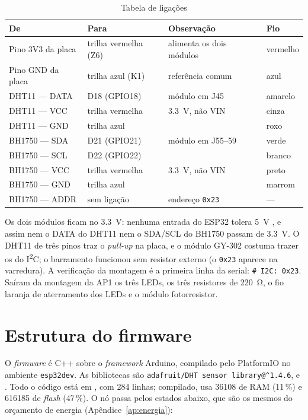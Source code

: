 \begin{table}[H]
\centering
\caption{Tabela de ligações}
\label{tab:ligacoes}
\footnotesize
\begin{tabular}{@{}L{3.6cm}L{3.4cm}L{4.4cm}L{1.8cm}@{}}
\toprule
\textbf{De} & \textbf{Para} & \textbf{Observação} & \textbf{Fio} \\
\midrule
Pino 3V3 da placa & trilha vermelha (Z6) & alimenta os dois módulos & vermelho \\
Pino GND da placa & trilha azul (K1) & referência comum & azul \\
DHT11 --- DATA & D18 (GPIO18) & módulo em J45 & amarelo \\
DHT11 --- VCC & trilha vermelha & \SI{3.3}{\volt}, não VIN & cinza \\
DHT11 --- GND & trilha azul & & roxo \\
BH1750 --- SDA & D21 (GPIO21) & módulo em J55--59 & verde \\
BH1750 --- SCL & D22 (GPIO22) & & branco \\
BH1750 --- VCC & trilha vermelha & \SI{3.3}{\volt}, não VIN & preto \\
BH1750 --- GND & trilha azul & & marrom \\
BH1750 --- ADDR & sem ligação & endereço \texttt{0x23} & --- \\
\bottomrule
\end{tabular}
\end{table}

Os dois módulos ficam no \SI{3.3}{\volt}: nenhuma entrada do ESP32
tolera \SI{5}{\volt} \cite{espressif2023}, e assim nem o DATA do DHT11
nem o SDA/SCL do BH1750 passam de \SI{3.3}{\volt}. O DHT11 de três
pinos traz o \emph{pull-up} na placa, e o módulo GY-302 costuma trazer os
do I\textsuperscript{2}C; o barramento funcionou sem resistor externo
(o \texttt{0x23} aparece na varredura).
A verificação da montagem é a primeira linha da serial: \texttt{\# I2C:
0x23}. Saíram da montagem da AP1 os três LEDs, os três resistores de
\SI{220}{\ohm}, o fio laranja de aterramento dos LEDs e o módulo
fotorresistor.

\section{Estrutura do firmware}
\label{sec:firmware}

O \emph{firmware} é C++ sobre o \emph{framework} Arduino, compilado pelo
PlatformIO no ambiente \texttt{esp32dev}. As bibliotecas são
\texttt{adafruit/\allowbreak DHT sensor library@\textasciicircum{}1.4.6},
 e
\cite{adafruitdht,nimblearduino}. Todo o código
está em , com 284 linhas; compilado, usa
\SI{36108}{\byte} de RAM (11\,\%) e \SI{616185}{\byte} de \emph{flash}
(47\,\%). O nó passa pelos estados abaixo, que são os mesmos do orçamento
de energia (Apêndice~\ref{ap:energia}):

